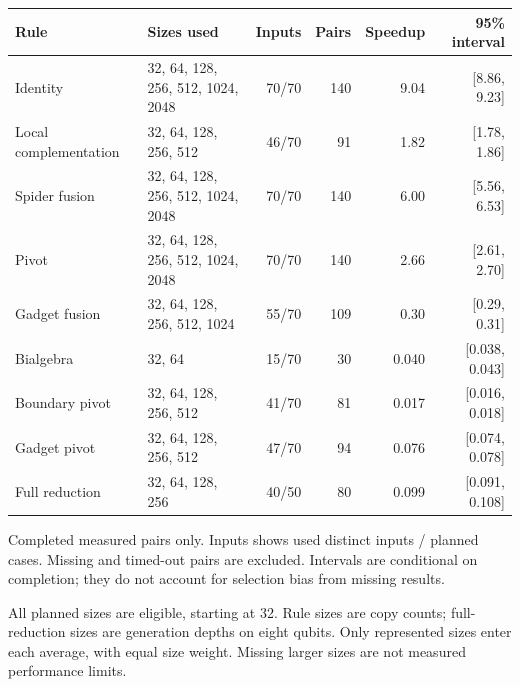\begin{tabular}{llrrrr}
\hline
Rule & Sizes used & Inputs & Pairs & Speedup & 95\% interval \\
\hline
Identity & 32, 64, 128, 256, 512, 1024, 2048 & 70/70 & 140 & 9.04 & [8.86, 9.23] \\
Local complementation & 32, 64, 128, 256, 512 & 46/70 & 91 & 1.82 & [1.78, 1.86] \\
Spider fusion & 32, 64, 128, 256, 512, 1024, 2048 & 70/70 & 140 & 6.00 & [5.56, 6.53] \\
Pivot & 32, 64, 128, 256, 512, 1024, 2048 & 70/70 & 140 & 2.66 & [2.61, 2.70] \\
Gadget fusion & 32, 64, 128, 256, 512, 1024 & 55/70 & 109 & 0.30 & [0.29, 0.31] \\
Bialgebra & 32, 64 & 15/70 & 30 & 0.040 & [0.038, 0.043] \\
Boundary pivot & 32, 64, 128, 256, 512 & 41/70 & 81 & 0.017 & [0.016, 0.018] \\
Gadget pivot & 32, 64, 128, 256, 512 & 47/70 & 94 & 0.076 & [0.074, 0.078] \\
Full reduction & 32, 64, 128, 256 & 40/50 & 80 & 0.099 & [0.091, 0.108] \\
\hline
\end{tabular}
\par\smallskip\noindent Completed measured pairs only. Inputs shows used distinct inputs / planned cases. Missing and timed-out pairs are excluded. Intervals are conditional on completion; they do not account for selection bias from missing results.
\par\noindent All planned sizes are eligible, starting at 32. Rule sizes are copy counts; full-reduction sizes are generation depths on eight qubits. Only represented sizes enter each average, with equal size weight. Missing larger sizes are not measured performance limits.
